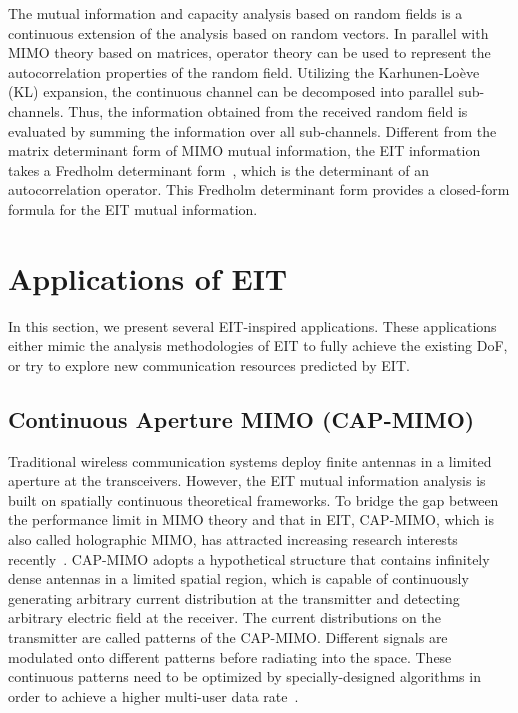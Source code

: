 \documentclass[journal,twocolumn]{IEEEtran}
\begin{document}
The mutual information and capacity analysis based on random fields is a continuous extension of the analysis based on random vectors. 
In parallel with MIMO theory based on matrices, operator theory can be used to represent the autocorrelation properties of the random field. 
Utilizing the Karhunen-Lo\`{e}ve (KL) expansion, the continuous channel can be decomposed into parallel sub-channels. 
Thus, the information obtained from the received random field is evaluated by summing the information over all sub-channels. 
Different from the matrix determinant form of MIMO mutual information, the EIT information takes a Fredholm determinant form~\cite{wan2022mutual}, which is the determinant of an autocorrelation operator. 
This Fredholm determinant form provides a closed-form formula for the EIT mutual information. 

\section{Applications of EIT}
In this section, we present several EIT-inspired applications. 
These applications either mimic the analysis methodologies of EIT to fully achieve the existing DoF, or try to explore new communication resources predicted by EIT. 

\vspace{-1em}
\subsection{Continuous Aperture MIMO (CAP-MIMO)}
Traditional wireless communication systems deploy finite antennas in a limited aperture at the transceivers. 
However, the EIT mutual information analysis is built on spatially continuous theoretical frameworks. 
To bridge the gap between the performance limit in MIMO theory and that in EIT, CAP-MIMO, which is also called holographic MIMO, has attracted increasing research interests recently~\cite{zhang2022pdma}. 
CAP-MIMO adopts a hypothetical structure that contains infinitely dense antennas in a limited spatial region, which is capable of continuously generating arbitrary current distribution at the transmitter and detecting arbitrary electric field at the receiver.  
The current distributions on the transmitter are called patterns of the CAP-MIMO. 
Different signals are modulated onto different patterns before radiating into the space. 
These continuous patterns need to be optimized by specially-designed algorithms in order to achieve a higher multi-user data rate~\cite{zhang2022pdma}. 
\end{document}
